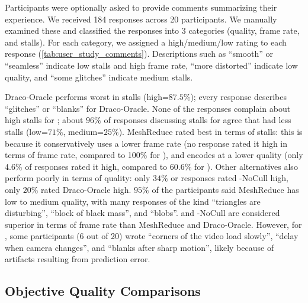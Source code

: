 %
Participants were optionally asked to provide comments summarizing their experience.
%
We received 184 responses across 20 participants.
%
We manually examined these and classified the responses into 3 categories (quality, frame rate, and stalls).
%
For each category, we assigned a high/medium/low rating to each response (\cref{tab:user_study_comments}).
%
Descriptions such as ``smooth'' or ``seamless'' indicate low stalls and high frame rate, ``more distorted'' indicate low quality, and ``some glitches'' indicate medium stalls.

Draco-Oracle performs worst in stalls (high=$87.5\%$); every response describes ``glitches'' or ``blanks'' for Draco-Oracle.
%
None of the responses complain about high stalls for \livo; about $96\%$ of responses discussing stalls for \livo agree that \livo had less stalls (low=$71\%$, medium=$25\%$).
%
MeshReduce rated best in terms of stalls: this is because it conservatively uses a lower frame rate (no response rated it high in terms of frame rate, compared to 100\% for \livo{}), and encodes at a lower quality (only 4.6\% of responses rated it high, compared to 60.6\% for \livo{}).
%
Other alternatives also perform poorly in terms of quality: only
$34\%$ or responses rated \livo-NoCull high, only $20\%$ rated Draco-Oracle high.
%
$95\%$ of the participants said MeshReduce has low to medium quality, with many responses of the kind ``triangles are disturbing'', ``block of black mass'', and ``blobs''. 
%
\livo and \livo-NoCull are considered superior in terms of frame rate than MeshReduce and Draco-Oracle. 
%
However, for \livo, some participants (6 out of 20) wrote ``corners of the video load slowly'', ``delay when camera changes'', and ``blanks after sharp motion'', likely because of artifacts resulting from prediction error.
%

\subsection{Objective Quality Comparisons}
\label{s:quality-comparison}


